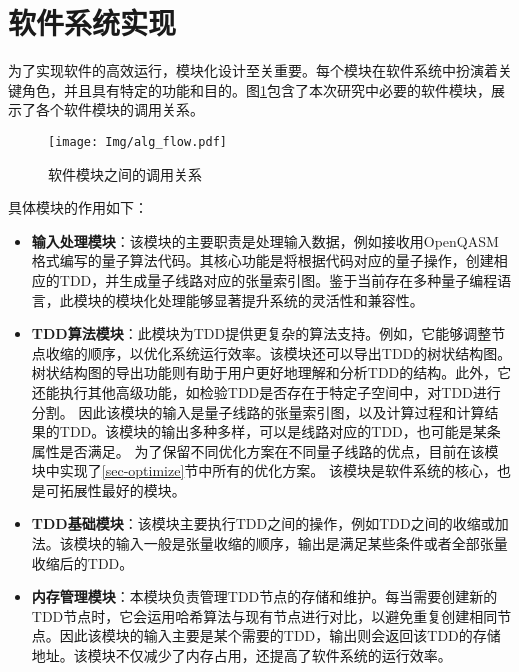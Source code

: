 \section{软件系统实现}
为了实现软件的高效运行，模块化设计至关重要。每个模块在软件系统中扮演着关键角色，并且具有特定的功能和目的。图\ref{fig-flow}包含了本次研究中必要的软件模块，展示了各个软件模块的调用关系。
\begin{figure}[htbp]
    \texttt{[image: Img/alg\_flow.pdf]}
    \caption{软件模块之间的调用关系}
    \label{fig-flow}
\end{figure}
具体模块的作用如下：
\begin{itemize}
    \item \textbf{输入处理模块}：该模块的主要职责是处理输入数据，例如接收用OpenQASM\citep{cross2017open}格式编写的量子算法代码。其核心功能是将根据代码对应的量子操作，创建相应的TDD，并生成量子线路对应的张量索引图。鉴于当前存在多种量子编程语言，此模块的模块化处理能够显著提升系统的灵活性和兼容性。
    \item \textbf{TDD算法模块}：此模块为TDD提供更复杂的算法支持。例如，它能够调整节点收缩的顺序，以优化系统运行效率。该模块还可以导出TDD的树状结构图。树状结构图的导出功能则有助于用户更好地理解和分析TDD的结构。此外，它还能执行其他高级功能，如检验TDD是否存在于特定子空间中，对TDD进行分割。
    因此该模块的输入是量子线路的张量索引图，以及计算过程和计算结果的TDD。该模块的输出多种多样，可以是线路对应的TDD，也可能是某条属性是否满足。
    为了保留不同优化方案在不同量子线路的优点，目前在该模块中实现了\ref{sec-optimize}节中所有的优化方案。
    该模块是软件系统的核心，也是可拓展性最好的模块。
    \item \textbf{TDD基础模块}：该模块主要执行TDD之间的操作，例如TDD之间的收缩或加法。该模块的输入一般是张量收缩的顺序，输出是满足某些条件或者全部张量收缩后的TDD。
    \item \textbf{内存管理模块}：本模块负责管理TDD节点的存储和维护。每当需要创建新的TDD节点时，它会运用哈希算法与现有节点进行对比，以避免重复创建相同节点。因此该模块的输入主要是某个需要的TDD，输出则会返回该TDD的存储地址。该模块不仅减少了内存占用，还提高了软件系统的运行效率。

\end{itemize}

